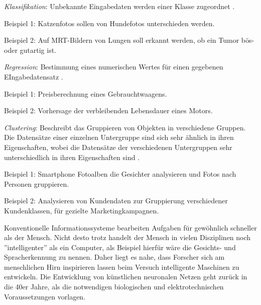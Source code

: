 \begin{itemize*}

\item \emph{Klassifikation}: Unbekannte Eingabedaten werden einer Klasse zugeordnet \cite [vgl. S. 68]{EM17}. 
\begin{itemize*}
\item Beispiel 1: Katzenfotos sollen von Hundefotos unterschieden werden.
\item Beispiel 2: Auf MRT-Bildern von Lungen soll erkannt werden, ob ein Tumor bös- oder gutartig ist.
\end{itemize*}
\item \emph{Regression}: Bestimmung eines numerischen Wertes für einen gegebenen EIngabedatensatz \cite {SG17}.   
\begin{itemize*}
\item Beispiel 1: Preisberechnung eines Gebrauchtwaagens.  
\item Beispiel 2: Vorhersage der verbleibenden Lebensdauer eines Motors.
\end{itemize*}
\item \emph{Clustering}: Beschreibt das Gruppieren von Objekten in verschiedene Gruppen. Die Datensätze einer einzelnen Untergruppe sind sich sehr ähnlich in ihren Eigenschaften, wobei die Datensätze der verschiedenen Untergruppen sehr unterschiedlich in ihren Eigenschaften sind \cite {SG17}.   
\begin{itemize*}
\item Beispiel 1: Smartphone Fotoalben die Gesichter analysieren und Fotos nach Personen gruppieren.  
\item Beispiel 2: Analysieren von Kundendaten zur Gruppierung verschiedener Kundenklassen, für gezielte Marketingkampagnen. 
\end{itemize*}

\end{itemize*}   

Konventionelle Informationssysteme bearbeiten Aufgaben für gewöhnlich schneller als der Mensch. Nicht desto trotz handelt der Mensch in vielen Disziplinen noch ''intelligenter'' als ein Computer, als Beispiel hierfür wäre die Gesichts- und Spracherkennung zu nennen. Daher liegt es nahe, dass Forscher sich am menschlichen Hirn inspirieren lassen beim Versuch intelligente Maschinen zu entwickeln. Die Entwicklung von künstlichen neuronalen Netzen geht zurück in die 40er Jahre, als die notwendigen biologischen und elektrotechnischen Voraussetzungen vorlagen.    

